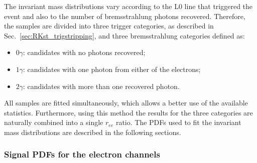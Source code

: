 The invariant mass distributions vary according to the
L0 line that triggered the event and also to the number of bremsstrahlung photons recovered.
Therefore, the samples are divided into three trigger categories, as described in
Sec.~\ref{sec:RKst_trigstripping}, and three bremsstrahlung categories defined as:
%
\begin{itemize}
\item $0\gamma$: candidates with no photons recovered;
\item $1\gamma$: candidates with one photon from either of the electrons;
\item $2\gamma$: candidates with more than one recovered photon.
\end{itemize}
%
All samples are fitted simultaneously, which allows a better use of the available statistics. 
Furthermore, using this method the results for the three categories are
naturally combined into a single $r_{ee}$ ratio.
%
The PDFs used to fit the invariant mass distributions are described in the following sections.



\subsubsection{Signal PDFs for the electron channels}
\label{sec:fit_ee_central}



